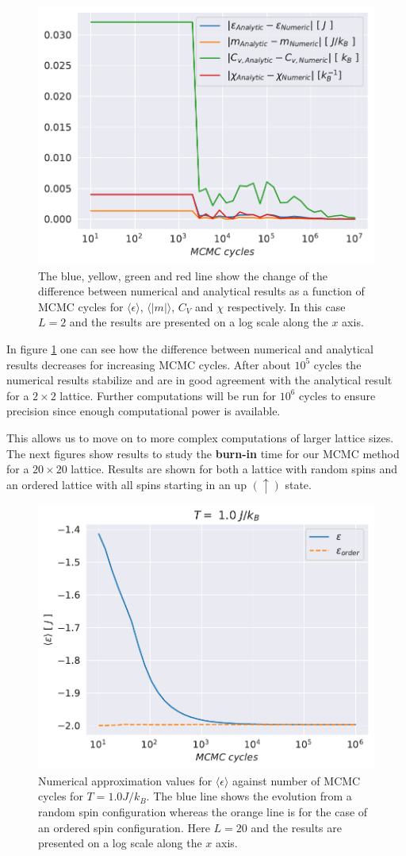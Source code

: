 \documentclass[english,notitlepage,reprint,nofootinbib]{revtex4-1}  %
\begin{document}
\begin{figure}[H]
    \centering
    \includegraphics[width=.5\textwidth]{../figures/numeric_analytic.pdf}
    \caption{The blue, yellow, green and red line show the change of the difference between numerical and analytical results as a function of MCMC cycles for $\langle \epsilon \rangle$, $\langle |m| \rangle$, $C_V$ and $\chi$ respectively. In this case $L=2$ and the results are presented on a log scale along the $x$ axis.}
    \label{fig:numeric_analytic}
\end{figure}
In figure \ref{fig:numeric_analytic} one can see how the difference between numerical and analytical results decreases for increasing MCMC cycles. After about $10^{5}$ cycles the numerical results stabilize and are in good agreement with the analytical result for a $2 \times 2$ lattice. Further computations will be run for $10^6$ cycles to ensure precision since enough computational power is available.

This allows us to move on to more complex computations of larger lattice sizes. The next figures show results to study the \textbf{burn-in} time for our MCMC method for a $20 \times 20$ lattice. Results are shown for both a lattice with random spins and an ordered lattice with all spins starting in an up $(\uparrow)$ state.

\begin{figure}[H]
    \centering
    \includegraphics[width=.5\textwidth]{../figures/numeric_L_20_T_1_e.pdf}
    \caption{Numerical approximation values for $\langle \epsilon \rangle$ against number of MCMC cycles for $T=1.0 J/k_B$. The blue line shows the evolution from a random spin configuration whereas the orange line is for the case of an ordered spin configuration. Here $L=20$ and the results are presented on a log scale along the $x$ axis.}
    \label{fig:numeric_L_20_T_1_e}
\end{figure}
\end{document}

